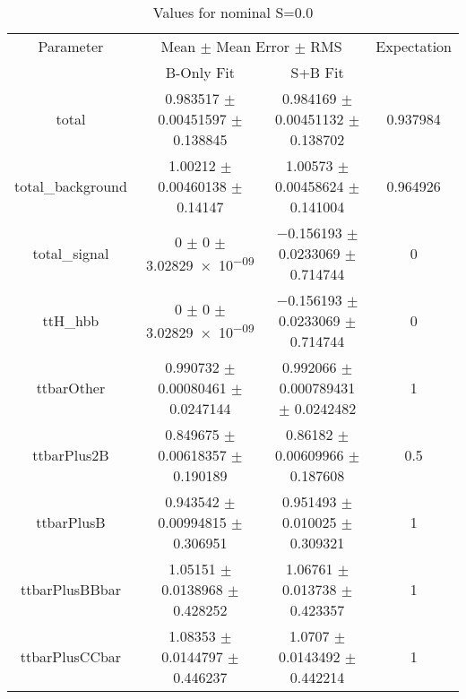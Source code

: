 \begin{table}
\centering
\caption{Values for nominal S=0.0}
\begin{tabular}{cccc}
\toprule
Parameter & \multicolumn{2}{c}{Mean $\pm$ Mean Error $\pm$ RMS} & Expectation\\
 & B-Only Fit & S+B Fit & \\
\midrule
total & \num{0.983517} $\pm$ \num{0.00451597} $\pm$ \num{0.138845} & \num{0.984169} $\pm$ \num{0.00451132} $\pm$ \num{0.138702} & \num{0.937984}\\
total\_background & \num{1.00212} $\pm$ \num{0.00460138} $\pm$ \num{0.14147} & \num{1.00573} $\pm$ \num{0.00458624} $\pm$ \num{0.141004} & \num{0.964926}\\
total\_signal & \num{0} $\pm$ \num{0} $\pm$ \num{3.02829e-09} & \num{-0.156193} $\pm$ \num{0.0233069} $\pm$ \num{0.714744} & \num{0}\\
ttH\_hbb & \num{0} $\pm$ \num{0} $\pm$ \num{3.02829e-09} & \num{-0.156193} $\pm$ \num{0.0233069} $\pm$ \num{0.714744} & \num{0}\\
ttbarOther & \num{0.990732} $\pm$ \num{0.00080461} $\pm$ \num{0.0247144} & \num{0.992066} $\pm$ \num{0.000789431} $\pm$ \num{0.0242482} & \num{1}\\
ttbarPlus2B & \num{0.849675} $\pm$ \num{0.00618357} $\pm$ \num{0.190189} & \num{0.86182} $\pm$ \num{0.00609966} $\pm$ \num{0.187608} & \num{0.5}\\
ttbarPlusB & \num{0.943542} $\pm$ \num{0.00994815} $\pm$ \num{0.306951} & \num{0.951493} $\pm$ \num{0.010025} $\pm$ \num{0.309321} & \num{1}\\
ttbarPlusBBbar & \num{1.05151} $\pm$ \num{0.0138968} $\pm$ \num{0.428252} & \num{1.06761} $\pm$ \num{0.013738} $\pm$ \num{0.423357} & \num{1}\\
ttbarPlusCCbar & \num{1.08353} $\pm$ \num{0.0144797} $\pm$ \num{0.446237} & \num{1.0707} $\pm$ \num{0.0143492} $\pm$ \num{0.442214} & \num{1}\\
\bottomrule
\end{tabular}
\end{table}